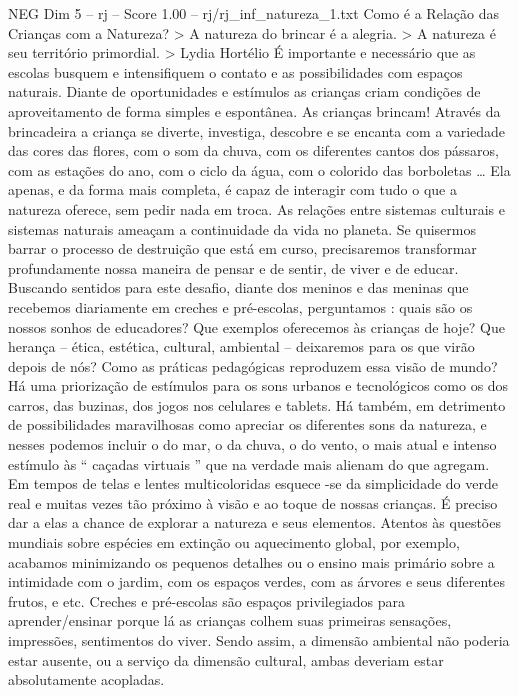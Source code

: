 \begin{textsample}{NEG Dim 5 – rj – Score 1.00 – rj/rj\_inf\_natureza\_1.txt}  \label{ex:f5_neg_098}
Como é a Relação das Crianças com a Natureza? > A natureza do brincar é a alegria. > A natureza é seu território primordial. > Lydia Hortélio É importante e necessário que as escolas busquem e intensifiquem o contato e as possibilidades com espaços naturais.
Diante de oportunidades e estímulos as crianças criam condições de aproveitamento de forma simples e espontânea.
As crianças brincam!
Através da brincadeira a criança se diverte, investiga, descobre e se encanta com a variedade das cores das flores, com o som da chuva, com os diferentes cantos dos pássaros, com as estações do ano, com o ciclo da água, com o colorido das borboletas … Ela apenas, e da forma mais completa, é capaz de interagir com tudo o que a natureza oferece, sem pedir nada em troca.
As relações entre sistemas culturais e sistemas naturais ameaçam a continuidade da vida no planeta.
Se quisermos barrar o processo de destruição que está em curso, precisaremos transformar profundamente nossa maneira de pensar e de sentir, de viver e de educar.
Buscando sentidos para este desafio, diante dos meninos e das meninas que recebemos diariamente em creches e pré-escolas, perguntamos : quais são os nossos sonhos de educadores?
Que exemplos oferecemos às crianças de hoje?
Que herança – ética, estética, cultural, ambiental – deixaremos para os que virão depois de nós?
Como as práticas pedagógicas reproduzem essa visão de mundo?
Há uma priorização de estímulos para os sons urbanos e tecnológicos como os dos carros, das buzinas, dos jogos nos celulares e tablets.
Há também, em detrimento de possibilidades maravilhosas como apreciar os diferentes sons da natureza, e nesses podemos incluir o do mar, o da chuva, o do vento, o mais atual e intenso estímulo às “ caçadas virtuais ” que na verdade mais alienam do que agregam.
Em tempos de telas e lentes multicoloridas esquece -se da simplicidade do verde real e muitas vezes tão próximo à visão e ao toque de nossas crianças.
É preciso dar a elas a chance de explorar a natureza e seus elementos.
Atentos às questões mundiais sobre espécies em extinção ou aquecimento global, por exemplo, acabamos minimizando os pequenos detalhes ou o ensino mais primário sobre a intimidade com o jardim, com os espaços verdes, com as árvores e seus diferentes frutos, e etc.
Creches e pré-escolas são espaços privilegiados para aprender/ensinar porque lá as crianças colhem suas primeiras sensações, impressões, sentimentos do viver.
Sendo assim, a dimensão ambiental não poderia estar ausente, ou a serviço da dimensão cultural, ambas deveriam estar absolutamente acopladas.

\end{textsample}
